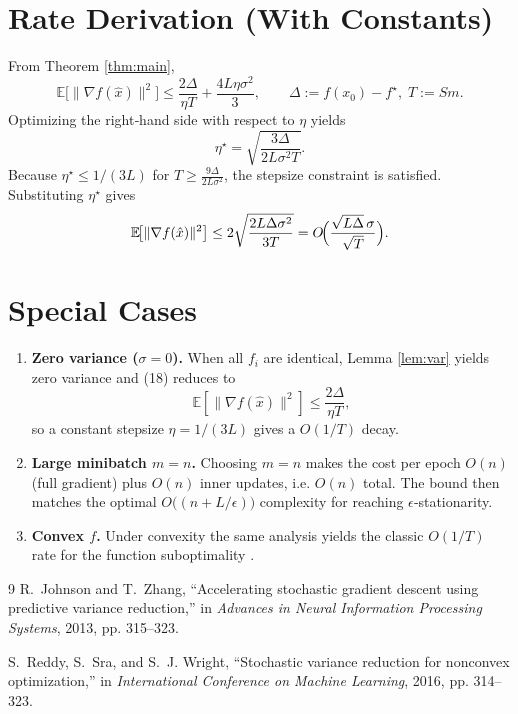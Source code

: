 \documentclass{article}
\newcommand{\E}{\mathbb{E}}
\begin{document}
\section*{Rate Derivation (With Constants)}
From Theorem \ref{thm:main},
\[
\E\!\bigl[\|\nabla f(\hat{x})\|^{2}\bigr]\le
\frac{2\Delta}{\eta T}
+\frac{4L\eta\sigma^{2}}{3},
\qquad \Delta:=f(x_0)-f^{\star},\; T:=Sm.
\]
Optimizing the right‑hand side with respect to $\eta$ yields
\[
\eta^{\star}= \sqrt{\frac{3\Delta}{2L\sigma^{2}T}}.
\]
Because $\eta^{\star}\le 1/(3L)$ for $T\ge \frac{9\Delta}{2L\sigma^{2}}$, the stepsize constraint is satisfied.  Substituting $\eta^{\star}$ gives
\[
\E\!\bigl[\|\nabla f(\hat{x})\|^{2}\bigr]
\le 2\sqrt{\frac{2L\Delta\sigma^{2}}{3T}}
= O\!\Bigl(\frac{\sqrt{L\Delta}\,\sigma}{\sqrt{T}}\Bigr).
\]

\section*{Special Cases}
\begin{enumerate}[label=\alph*)]
\item \textbf{Zero variance ($\sigma=0$).}  When all $f_i$ are identical, Lemma \ref{lem:var} yields zero variance and (18) reduces to
\[
\E[\|\nabla f(\hat{x})\|^{2}]\le \frac{2\Delta}{\eta T},
\]
so a constant stepsize $\eta=1/(3L)$ gives a $O(1/T)$ decay.
\item \textbf{Large minibatch $m=n$.}  Choosing $m=n$ makes the cost per epoch $O(n)$ (full gradient) plus $O(n)$ inner updates, i.e. $O(n)$ total.  The bound then matches the optimal $O\bigl((n+L/\epsilon)\bigr)$ complexity for reaching $\epsilon$‑stationarity.
\item \textbf{Convex $f$.}  Under convexity the same analysis yields the classic $O(1/T)$ rate for the function suboptimality \cite{johnson2013accelerating}.
\end{enumerate}

\begin{thebibliography}{9}
R.~Johnson and T.~Zhang, ``Accelerating stochastic gradient descent using
  predictive variance reduction,'' in \emph{Advances in Neural Information
  Processing Systems}, 2013, pp. 315--323.

S.~Reddy, S.~Sra, and S.~J. Wright, ``Stochastic variance reduction for
  nonconvex optimization,'' in \emph{International Conference on Machine
  Learning}, 2016, pp. 314–323.
\end{thebibliography}
\end{document}
